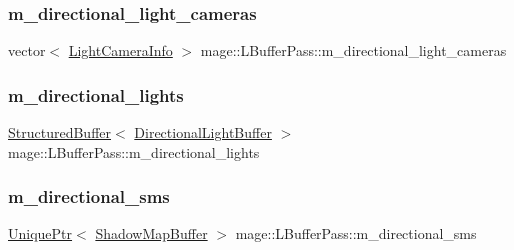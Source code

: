 \hypertarget{structmage_1_1_l_buffer_pass_a42f79f890d6c6ec342f365bf974ab3a6}{}\label{structmage_1_1_l_buffer_pass_a42f79f890d6c6ec342f365bf974ab3a6} 
\subsubsection{\texorpdfstring{m\+\_\+directional\+\_\+light\+\_\+cameras}{m\_directional\_light\_cameras}}
{\footnotesize\ttfamily vector$<$ \hyperlink{structmage_1_1_light_camera_info}{Light\+Camera\+Info} $>$ mage\+::\+L\+Buffer\+Pass\+::m\+\_\+directional\+\_\+light\+\_\+cameras\hspace{0.3cm}{\ttfamily [private]}}

\hypertarget{structmage_1_1_l_buffer_pass_a90327556a34fe3a56e6980accead0c44}{}\label{structmage_1_1_l_buffer_pass_a90327556a34fe3a56e6980accead0c44} 
\subsubsection{\texorpdfstring{m\+\_\+directional\+\_\+lights}{m\_directional\_lights}}
{\footnotesize\ttfamily \hyperlink{structmage_1_1_structured_buffer}{Structured\+Buffer}$<$ \hyperlink{structmage_1_1_directional_light_buffer}{Directional\+Light\+Buffer} $>$ mage\+::\+L\+Buffer\+Pass\+::m\+\_\+directional\+\_\+lights\hspace{0.3cm}{\ttfamily [private]}}

\hypertarget{structmage_1_1_l_buffer_pass_ab1372d2fc5e0e716565f8d3d8eb6db97}{}\label{structmage_1_1_l_buffer_pass_ab1372d2fc5e0e716565f8d3d8eb6db97} 
\subsubsection{\texorpdfstring{m\+\_\+directional\+\_\+sms}{m\_directional\_sms}}
{\footnotesize\ttfamily \hyperlink{namespacemage_a3316d7143a973e37adf1110f2e80ca31}{Unique\+Ptr}$<$ \hyperlink{structmage_1_1_shadow_map_buffer}{Shadow\+Map\+Buffer} $>$ mage\+::\+L\+Buffer\+Pass\+::m\+\_\+directional\+\_\+sms\hspace{0.3cm}{\ttfamily [private]}}

